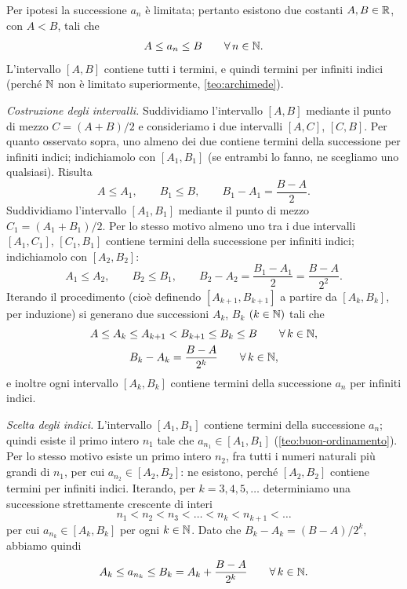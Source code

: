 \begin{dimostrazione}
Per ipotesi la successione $a_{n}$ è limitata; pertanto esistono due costanti $A,B\in\mathbb{R}$,
con $A<B$, tali che
\begin{equation}\label{eq:bw-limitata}
  A\le a_{n}\le B \qquad\forall\, n\in\mathbb{N} .
\end{equation}
L'intervallo $[A,B]$ contiene tutti i termini, e quindi termini per infiniti indici
(perché $\mathbb{N}$ non è limitato superiormente, \cref{teo:archimede}).

\emph{Costruzione degli intervalli.} Suddividiamo l'intervallo $[A,B]$ mediante il punto
di mezzo $C=(A+B)/2$ e consideriamo i due intervalli $[A,C]$, $[C,B]$. Per quanto
osservato sopra, uno almeno dei due contiene termini della successione per infiniti
indici; indichiamolo con $[A_{1},B_{1}]$ (se entrambi lo fanno, ne scegliamo
uno qualsiasi). Risulta
\begin{equation}\label{eq:bw-passo1}
  A\le A_{1}, \qquad B_{1}\le B, \qquad B_{1}-A_{1}=\frac{B-A}{2}.
\end{equation}
Suddividiamo l'intervallo $[A_{1},B_{1}]$ mediante il punto di mezzo
$C_{1}=(A_{1}+B_{1})/2$. Per lo stesso motivo almeno uno tra i due intervalli
$[A_{1},C_{1}]$, $[C_{1},B_{1}]$ contiene termini della successione per infiniti indici;
indichiamolo con $[A_{2},B_{2}]$:
\begin{equation}\label{eq:bw-passo2}
  A_{1}\le A_{2}, \qquad B_{2}\le B_{1}, \qquad B_{2}-A_{2}=\frac{B_{1}-A_{1}}{2}=\frac{B-A}{2^{2}}.
\end{equation}
Iterando il procedimento (cioè definendo $[A_{k+1},B_{k+1}]$ a partire da $[A_{k},B_{k}]$,
per induzione) si generano due successioni $A_{k}$, $B_{k}$ $(k\in\mathbb{N})$ tali che
\begin{gather}
  A\le A_{k}\le A_{k+1}<B_{k+1}\le B_{k}\le B \qquad\forall\, k\in\mathbb{N}, \label{eq:bw-incapsulati}\\
  B_{k}-A_{k}=\frac{B-A}{2^{k}} \qquad\forall\, k\in\mathbb{N}, \label{eq:bw-lunghezza}
\end{gather}
e inoltre ogni intervallo $[A_{k},B_{k}]$ contiene termini della successione $a_{n}$ per
infiniti indici.

\emph{Scelta degli indici.} L'intervallo $[A_{1},B_{1}]$ contiene termini della
successione $a_{n}$; quindi esiste il primo intero $n_{1}$ tale che
$a_{n_{1}}\in[A_{1},B_{1}]$ (\cref{teo:buon-ordinamento}). Per lo stesso motivo esiste un
primo intero $n_{2}$, fra tutti i numeri naturali più grandi di $n_{1}$, per cui
$a_{n_{2}}\in[A_{2},B_{2}]$: ne esistono, perché $[A_{2},B_{2}]$ contiene termini per
infiniti indici. Iterando, per $k=3,4,5,\dots$ determiniamo una successione
strettamente crescente di interi
\begin{equation}\label{eq:bw-indici}
  n_{1}<n_{2}<n_{3}<\dots<n_{k}<n_{k+1}<\dots
\end{equation}
per cui $a_{n_{k}}\in[A_{k},B_{k}]$ per ogni $k\in\mathbb{N}$. Dato che
$B_{k}-A_{k}=(B-A)/2^{k}$, abbiamo quindi
\begin{equation}\label{eq:bw-carabinieri}
  A_{k}\le a_{n_{k}}\le B_{k}=A_{k}+\frac{B-A}{2^{k}} \qquad\forall\, k\in\mathbb{N} .
\end{equation}


\end{dimostrazione}
